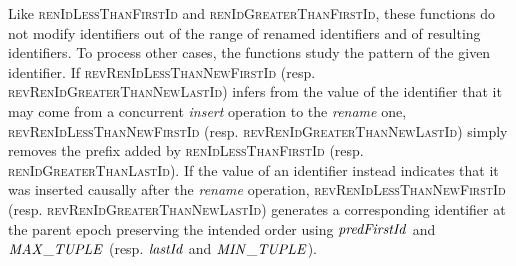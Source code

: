 Like \textsc{renIdLessThanFirstId} and \textsc{renIdGreaterThanFirstId}, these functions do not modify identifiers out of the range of renamed identifiers and of resulting identifiers.
%
To process other cases, the functions study the pattern of the given identifier.
If \textsc{revRenIdLessThanNewFirstId} (resp. \textsc{revRenIdGreaterThanNewLastId}) infers from the value of the identifier that it may come from a concurrent \emph{insert} operation to the \emph{rename} one, \textsc{revRenIdLessThanNewFirstId} (resp. \textsc{revRenIdGreaterThanNewLastId}) simply removes the prefix added by \textsc{renIdLessThanFirstId} (resp. \textsc{renIdGreaterThanLastId}).
%
If the value of an identifier instead indicates that it was inserted causally after the \emph{rename} operation, \textsc{revRenIdLessThanNewFirstId} (resp. \textsc{revRenIdGreaterThanNewLastId}) generates a corresponding identifier at the parent epoch preserving the intended order using $\mathit{predFirstId}$ and $\mathit{MAX\_TUPLE}$ (resp. $\mathit{lastId}$ and $\mathit{MIN\_TUPLE}$).
